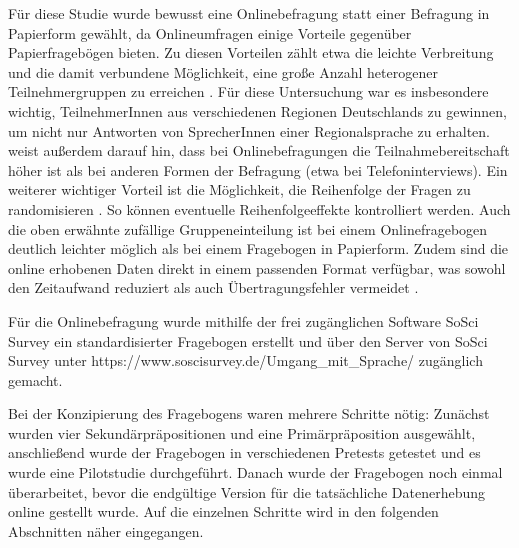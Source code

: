 Für diese Studie wurde bewusst eine Onlinebefragung statt einer Befragung in Papierform gewählt, da Onlineumfragen einige Vorteile gegenüber Papierfragebögen bieten. 
Zu diesen Vorteilen zählt etwa die leichte Verbreitung und die damit verbundene Möglichkeit, eine große Anzahl heterogener Teilnehmergruppen zu erreichen \citep[s.][77]{Potschke2009}. 
Für diese Untersuchung war es insbesondere wichtig, TeilnehmerInnen aus verschiedenen Regionen Deutschlands zu gewinnen, um nicht nur Antworten von SprecherInnen einer Regionalsprache zu erhalten. 
\citet[78]{Potschke2009} weist außerdem darauf hin, dass bei Onlinebefragungen die Teilnahmebereitschaft höher ist als bei anderen Formen der Befragung (etwa bei Telefoninterviews). 
Ein weiterer wichtiger Vorteil ist die Möglichkeit, die Reihenfolge der Fragen zu randomisieren \citep[s.][109]{Baur2009}. 
So können eventuelle Reihenfolgeeffekte kontrolliert werden. 
Auch die oben erwähnte zufällige Gruppeneinteilung ist bei einem Onlinefragebogen deutlich leichter möglich als bei einem Fragebogen in Papierform. 
Zudem sind die online erhobenen Daten direkt in einem passenden Format verfügbar, was sowohl den Zeitaufwand reduziert als auch Übertragungsfehler vermeidet \citep[s.][77]{Potschke2009}.

Für die Onlinebefragung wurde mithilfe der frei zugänglichen Software SoSci Survey \citep[s.][]{Leiner2014} ein standardisierter Fragebogen erstellt und über den Server von SoSci Survey unter https://www.soscisurvey.de/Umgang\_mit\_Sprache/ zugänglich gemacht.  

Bei der Konzipierung des Fragebogens waren mehrere Schritte nötig: Zunächst wurden vier Sekundärpräpositionen und eine Primärpräposition ausgewählt, anschließend wurde der Fragebogen in verschiedenen Pretests getestet und es wurde eine Pilotstudie durchgeführt. Danach wurde der Fragebogen noch einmal überarbeitet, bevor die endgültige Version für die tatsächliche Datenerhebung online gestellt wurde. Auf die einzelnen Schritte wird in den folgenden Abschnitten näher eingegangen. 
